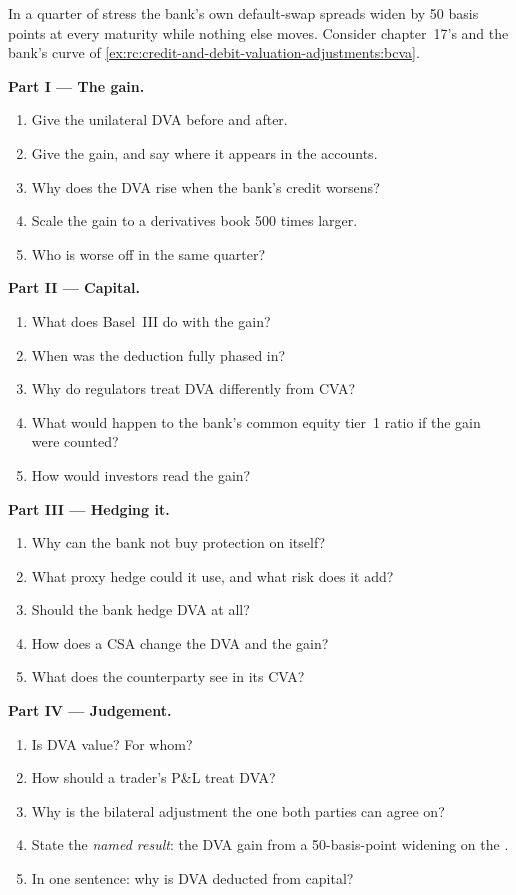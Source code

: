 \begin{problem}\label{pb:rc:credit-and-debit-valuation-adjustments:1}
In a quarter of stress the bank's own default-swap spreads widen by 50 basis points at every
maturity while nothing else moves. Consider chapter~17's  and the bank's curve of
\cref{ex:rc:credit-and-debit-valuation-adjustments:bcva}.

\medskip\noindent\textbf{Part I --- The gain.}
\begin{enumerate}
\item Give the unilateral DVA before and after.
\item Give the gain, and say where it appears in the accounts.
\item Why does the DVA rise when the bank's credit worsens?
\item Scale the gain to a derivatives book 500 times larger.
\item Who is worse off in the same quarter?
\end{enumerate}

\medskip\noindent\textbf{Part II --- Capital.}
\begin{enumerate}[resume]
\item What does Basel~III do with the gain?
\item When was the deduction fully phased in?
\item Why do regulators treat DVA differently from CVA?
\item What would happen to the bank's common equity tier~1 ratio if the gain were counted?
\item How would investors read the gain?
\end{enumerate}

\medskip\noindent\textbf{Part III --- Hedging it.}
\begin{enumerate}[resume]
\item Why can the bank not buy protection on itself?
\item What proxy hedge could it use, and what risk does it add?
\item Should the bank hedge DVA at all?
\item How does a CSA change the DVA and the gain?
\item What does the counterparty see in its CVA?
\end{enumerate}

\medskip\noindent\textbf{Part IV --- Judgement.}
\begin{enumerate}[resume]
\item Is DVA value? For whom?
\item How should a trader's P\&L treat DVA?
\item Why is the bilateral adjustment the one both parties can agree on?
\item State the \emph{named result}: the DVA gain from a 50-basis-point widening on the
.
\item In one sentence: why is DVA deducted from capital?
\end{enumerate}
\end{problem}


